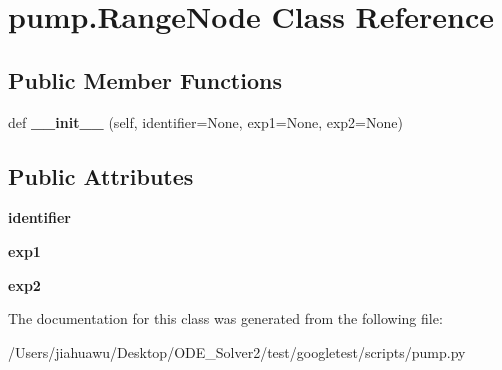 \hypertarget{classpump_1_1_range_node}{}\section{pump.\+Range\+Node Class Reference}
\label{classpump_1_1_range_node}
\subsection*{Public Member Functions}
\begin{DoxyCompactItemize}
\item 
\mbox{\label{classpump_1_1_range_node_a58e85945a5a6e2f899e8243422c871e3}} 
def {\bfseries \+\_\+\+\_\+init\+\_\+\+\_\+} (self, identifier=None, exp1=None, exp2=None)
\end{DoxyCompactItemize}
\subsection*{Public Attributes}
\begin{DoxyCompactItemize}
\item 
\mbox{\label{classpump_1_1_range_node_ae75b9f31ba8c3bd048cf09b22035efa0}} 
{\bfseries identifier}
\item 
\mbox{\label{classpump_1_1_range_node_acbb59f8c5e23d23563ca03f21574ce63}} 
{\bfseries exp1}
\item 
\mbox{\label{classpump_1_1_range_node_afe153ee472b121652a51c62c1522cc13}} 
{\bfseries exp2}
\end{DoxyCompactItemize}


The documentation for this class was generated from the following file\+:\begin{DoxyCompactItemize}
\item 
/\+Users/jiahuawu/\+Desktop/\+O\+D\+E\+\_\+\+Solver2/test/googletest/scripts/pump.\+py\end{DoxyCompactItemize}
